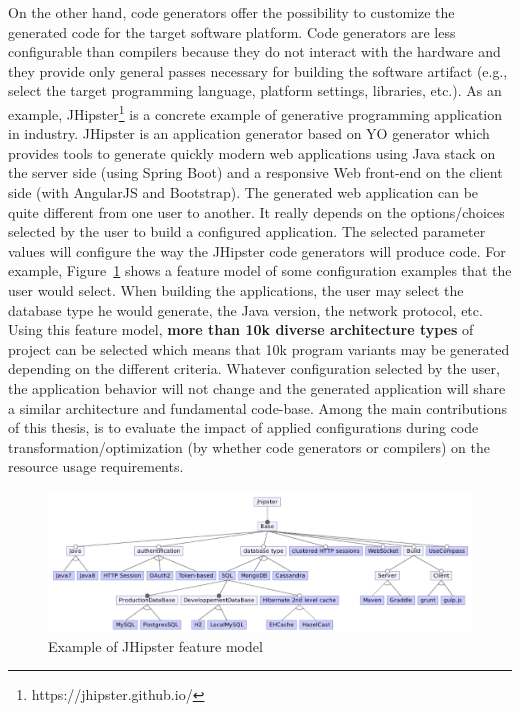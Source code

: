On the other hand, code generators offer the possibility to customize the generated code for the target software platform. Code generators are less configurable than compilers because they do not interact with the hardware and they provide only general passes necessary for building the software artifact (e.g., select the target programming language, platform settings, libraries, etc.).
As an example, JHipster\footnote{https://jhipster.github.io/} is a concrete example of generative programming application in industry. JHipster is an application generator based on YO generator which provides tools to generate quickly modern web applications using Java stack on the server side (using Spring Boot) and a responsive Web front-end on the client side (with AngularJS and Bootstrap).
The generated web application can be quite different from one user to another. It really depends on the options/choices selected by the user to build a configured application. The selected parameter values will configure the way the JHipster code generators will produce code. 
For example, Figure~\ref{fig:jhipster} shows a feature model of some configuration examples that the user would select. When building the applications, the user may select the database type he would generate, the Java version, the network protocol, etc. 
Using this feature model, \textbf{more than 10k diverse architecture types} of project can be selected which means that 10k program variants may be generated depending on the different criteria.
Whatever configuration selected by the user, the application behavior will not change and the generated application will share a similar architecture and fundamental code-base.
Among the main contributions of this thesis,  is to evaluate the impact of applied configurations during code transformation/optimization (by whether code generators or compilers) on the resource usage requirements.
\begin{figure}[h]
	\center
	\includegraphics[scale=0.65]{Background/fig/jhipster}
	\caption{Example of JHipster feature model}
	\label{fig:jhipster}
\end{figure}

